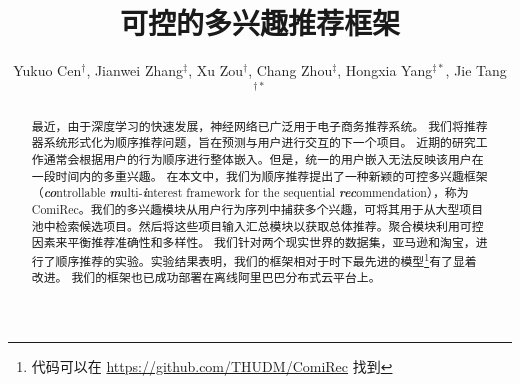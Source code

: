 \documentclass[sigconf]{acmart}
\newcommand{\model}{{ComiRec}}
\begin{document}
\fancyhead{}

\title{可控的多兴趣推荐框架}

\author[Y. Cen, J. Zhang, X. Zou, C. Zhou, H. Yang and J. Tang]{
    Yukuo Cen$^{\dagger}$, Jianwei Zhang$^{\ddagger}$, Xu Zou$^{\dagger}$, Chang Zhou$^{\ddagger}$, Hongxia Yang$^{\ddagger*}$, Jie Tang$^{\dagger*}$
}


\renewcommand{\authors}{Yukuo Cen, Jianwei Zhang, Xu Zou, Chang Zhou, Hongxia Yang and Jie Tang}
\renewcommand{\shortauthors}{Y. Cen et al.}


\begin{abstract}
\renewcommand{\thefootnote}{\fnsymbol{footnote}}
\renewcommand{\thefootnote}{\arabic{footnote}}


最近，由于深度学习的快速发展，神经网络已广泛用于电子商务推荐系统。
我们将推荐器系统形式化为顺序推荐问题，旨在预测与用户进行交互的下一个项目。
近期的研究工作通常会根据用户的行为顺序进行整体嵌入。但是，统一的用户嵌入无法反映该用户在一段时间内的多重兴趣。
在本文中，我们为顺序推荐提出了一种新颖的可控多兴趣框架（\textbf{\textit{co}}ntrollable \textbf{\textit{m}}ulti-\textbf{\textit{i}}nterest framework for the sequential \textbf{\textit{rec}}ommendation），称为 \model。我们的多兴趣模块从用户行为序列中捕获多个兴趣，可将其用于从大型项目池中检索候选项目。然后将这些项目输入汇总模块以获取总体推荐。聚合模块利用可控因素来平衡推荐准确性和多样性。
我们针对两个现实世界的数据集，亚马逊和淘宝，进行了顺序推荐的实验。实验结果表明，我们的框架相对于时下最先进的模型\footnote{代码可以在 \url{https://github.com/THUDM/ComiRec} 找到}有了显着改进。
我们的框架也已成功部署在离线阿里巴巴分布式云平台上。
\end{abstract}
\end{document}
